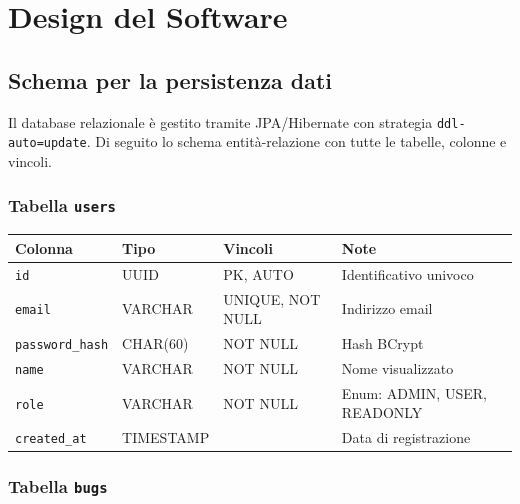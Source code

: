 ﻿\documentclass[a4paper,11pt]{article}
\begin{document}
\section{Design del Software}

\subsection{Schema per la persistenza dati}

Il database relazionale \`e gestito tramite JPA/Hibernate con strategia \texttt{ddl-auto=update}. Di seguito lo schema entit\`a-relazione con tutte le tabelle, colonne e vincoli.

\subsubsection{Tabella \texttt{users}}

\begin{tabular}{|l|l|l|p{5cm}|}
\hline
\textbf{Colonna} & \textbf{Tipo} & \textbf{Vincoli} & \textbf{Note} \\
\hline
\texttt{id} & UUID & PK, AUTO & Identificativo univoco \\
\hline
\texttt{email} & VARCHAR & UNIQUE, NOT NULL & Indirizzo email \\
\hline
\texttt{password\_hash} & CHAR(60) & NOT NULL & Hash BCrypt \\
\hline
\texttt{name} & VARCHAR & NOT NULL & Nome visualizzato \\
\hline
\texttt{role} & VARCHAR & NOT NULL & Enum: ADMIN, USER, READONLY \\
\hline
\texttt{created\_at} & TIMESTAMP & & Data di registrazione \\
\hline
\end{tabular}

\subsubsection{Tabella \texttt{bugs}}
\end{document}
